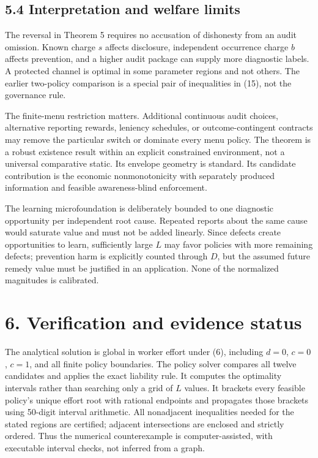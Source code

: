 \documentclass[
  11pt,
]{article}
\begin{document}
\subsection{5.4 Interpretation and welfare
limits}\label{interpretation-and-welfare-limits}

The reversal in Theorem 5 requires no accusation of dishonesty from an
audit omission. Known charge \(s\) affects disclosure, independent
occurrence charge \(b\) affects prevention, and a higher audit package
can supply more diagnostic labels. A protected channel is optimal in
some parameter regions and not others. The earlier two-policy comparison
is a special pair of inequalities in (15), not the governance rule.

The finite-menu restriction matters. Additional continuous audit
choices, alternative reporting rewards, leniency schedules, or
outcome-contingent contracts may remove the particular switch or
dominate every menu policy. The theorem is a robust existence result
within an explicit constrained environment, not a universal comparative
static. Its envelope geometry is standard. Its candidate contribution is
the economic nonmonotonicity with separately produced information and
feasible awareness-blind enforcement.

The learning microfoundation is deliberately bounded to one diagnostic
opportunity per independent root cause. Repeated reports about the same
cause would saturate value and must not be added linearly. Since defects
create opportunities to learn, sufficiently large \(L\) may favor
policies with more remaining defects; prevention harm is explicitly
counted through \(D\), but the assumed future remedy value must be
justified in an application. None of the normalized magnitudes is
calibrated.

\section{6. Verification and evidence
status}\label{verification-and-evidence-status}

The analytical solution is global in worker effort under (6), including
\(d=0\), \(c=0\), \(c=1\), and all finite policy boundaries. The policy
solver compares all twelve candidates and applies the exact liability
rule. It computes the optimality intervals rather than searching only a
grid of \(L\) values. It brackets every feasible policy's unique effort
root with rational endpoints and propagates those brackets using
50-digit interval arithmetic. All nonadjacent inequalities needed for
the stated regions are certified; adjacent intersections are enclosed
and strictly ordered. Thus the numerical counterexample is
computer-assisted, with executable interval checks, not inferred from a
graph.
\end{document}
